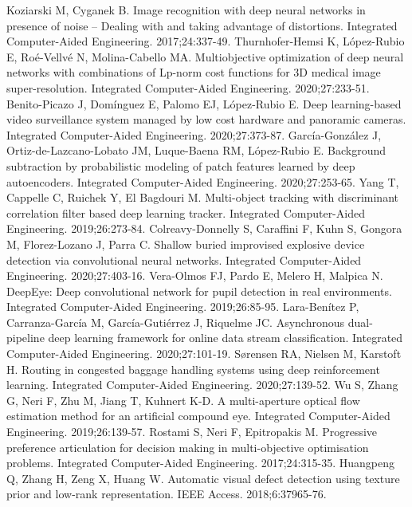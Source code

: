 \begin{thebibliography}{99}
Koziarski M, Cyganek B. Image recognition with deep neural networks in presence of noise -- Dealing with and taking advantage of distortions. Integrated Computer-Aided Engineering. 2017;24:337-49.
Thurnhofer-Hemsi K, L\'{o}pez-Rubio E, Ro\'{e}-Vellv\'{e} N, Molina-Cabello MA. Multiobjective optimization of deep neural networks with combinations of Lp-norm cost functions for 3D medical image super-resolution. Integrated Computer-Aided Engineering. 2020;27:233-51.
Benito-Picazo J, Domínguez E, Palomo EJ, López-Rubio E. Deep learning-based video surveillance system managed by low cost hardware and panoramic cameras. Integrated Computer-Aided Engineering. 2020;27:373-87. 
Garc\'{i}a-Gonz\'{a}lez J, Ortiz-de-Lazcano-Lobato JM, Luque-Baena RM, L\'{o}pez-Rubio E. Background subtraction by probabilistic modeling of patch features learned by deep autoencoders. Integrated Computer-Aided Engineering. 2020;27:253-65.
Yang T, Cappelle C, Ruichek Y, El Bagdouri M. Multi-object tracking with discriminant correlation filter based deep learning tracker. Integrated Computer-Aided Engineering. 2019;26:273-84.
Colreavy-Donnelly S, Caraffini F, Kuhn S, Gongora M, Florez-Lozano J, Parra C. Shallow buried improvised explosive device detection via convolutional neural networks. Integrated Computer-Aided Engineering. 2020;27:403-16.
Vera-Olmos FJ, Pardo E, Melero H, Malpica N. DeepEye: Deep convolutional network for pupil detection in real environments. Integrated Computer-Aided Engineering. 2019;26:85-95.
Lara-Ben\'{i}tez P, Carranza-Garc\'{i}a M, García-Guti\'{e}rrez J, Riquelme JC. Asynchronous dual-pipeline deep learning framework for online data stream classification. Integrated Computer-Aided Engineering. 2020;27:101-19.
Sørensen RA, Nielsen M, Karstoft H. Routing in congested baggage handling systems using deep reinforcement learning. Integrated Computer-Aided Engineering. 2020;27:139-52.
Wu S, Zhang G, Neri F, Zhu M, Jiang T, Kuhnert K-D. A multi-aperture optical flow estimation method for an artificial compound eye. Integrated Computer-Aided Engineering. 2019;26:139-57.
Rostami S, Neri F, Epitropakis M. Progressive preference articulation for decision making in multi-objective optimisation problems. Integrated Computer-Aided Engineering. 2017;24:315-35.
Huangpeng Q, Zhang H, Zeng X, Huang W. Automatic visual defect detection using texture prior and low-rank representation. IEEE Access. 2018;6:37965-76.

\end{thebibliography}
